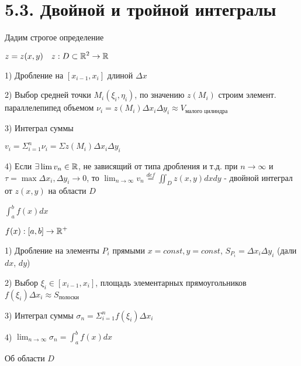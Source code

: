 \documentclass[12pt]{article}
\begin{document}
    \section{5.3. Двойной и тройной интегралы}

    \Nota Дадим строгое определение

    \begin{multicols}{2}
        \Def $\displaystyle z = z(x, y) \quad z : D \subset \mathbb{R}^2 \rightarrow \mathbb{R}$

        1) Дробление на $\displaystyle [x_{i-1}, x_i]$ длиной $\Delta x$

        2) Выбор средней точки $\displaystyle M_i(\xi_i, \eta_i)$, по значению $\displaystyle z(M_i)$ строим элемент. параллелепипед объемом
        $\displaystyle \nu_i = z(M_i) \Delta x_i \Delta y_i \approx V_{\text{малого цилиндра}}$

        3) Интеграл суммы

        $\displaystyle v_i = \Sigma_{i=1}^n \nu_i = \Sigma z(M_i) \Delta x_i \Delta y_i$

        4) Если $\displaystyle \exists \lim v_n \in \mathbb{R}$, не зависящий от типа дробления и т.д. при $n \rightarrow \infty$ и
        $\displaystyle \tau = \max \Delta x_i, \Delta y_i \to 0$, то $\displaystyle \lim_{n\to\infty} v_n \stackrel{def}{=} \iint_D z(x, y) dx dy$ - двойной интеграл от $z(x, y)$ на области $D$



        \Mem $\displaystyle \int_a^b f(x) dx$

        $\displaystyle f(x) : [a, b] \rightarrow \mathbb{R}^+$

        \vspace{10mm}

        1) Дробление на элементы $\displaystyle P_i$ прямыми $x = const, y = const$, $\displaystyle S_{P_i} = \Delta x_i \Delta y_i$ (дали $dx$, $dy$)

        2) Выбор $\displaystyle \xi_i \in [x_{i-1}, x_i]$, площадь элементарных прямоугольников $\displaystyle f(\xi_i)\Delta x_i \approx S_{\text{полоски}}$

        3) Интеграл суммы $\displaystyle \sigma_n = \Sigma_{i=1}^n f(\xi_i) \Delta x_i$

        4) $\displaystyle \lim_{n\to\infty} \sigma_n = \int^b_a f(x) dx$

    \end{multicols}

    \Nota Об области $D$
\end{document}
